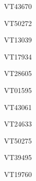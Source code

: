 \documentclass[17pt]{extarticle}
\begin{document}
\begin{large}
VT43670 \\[0.5em]
\end{large}
\footnotesize
\newpage\vspace*{-0.15cm}
\begin{large}
VT50272 \\[0.5em]
\end{large}
\footnotesize
\newpage\vspace*{-0.15cm}
\begin{large}
VT13039 \\[0.5em]
\end{large}
\footnotesize
\newpage\vspace*{-0.15cm}
\begin{large}
VT17934 \\[0.5em]
\end{large}
\footnotesize
\newpage\vspace*{-0.15cm}
\begin{large}
VT28605 \\[0.5em]
\end{large}
\footnotesize
\newpage\vspace*{-0.15cm}
\begin{large}
VT01595 \\[0.5em]
\end{large}
\footnotesize
\newpage\vspace*{-0.15cm}
\begin{large}
VT43061 \\[0.5em]
\end{large}
\footnotesize
\newpage\vspace*{-0.15cm}
\begin{large}
VT24633 \\[0.5em]
\end{large}
\footnotesize
\newpage\vspace*{-0.15cm}
\begin{large}
VT50275 \\[0.5em]
\end{large}
\footnotesize
\newpage\vspace*{-0.15cm}
\begin{large}
VT39495 \\[0.5em]
\end{large}
\footnotesize
\newpage\vspace*{-0.15cm}
\begin{large}
VT19760 \\[0.5em]
\end{large}
\end{document}
